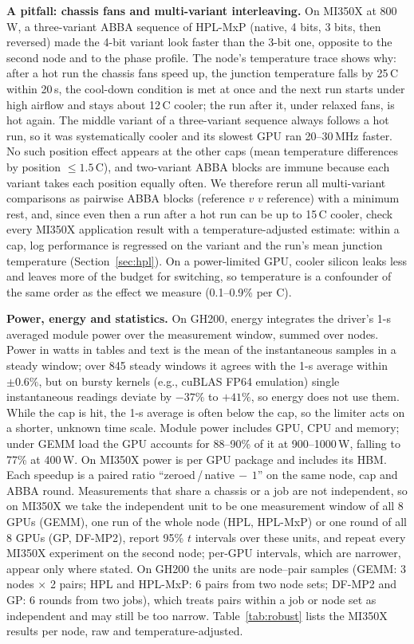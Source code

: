 \documentclass[conference]{IEEEtran}
\newcommand{\W}{\,W}
\newcommand{\pct}{\%}
\begin{document}
\textbf{A pitfall: chassis fans and multi-variant interleaving.} On MI350X at 800\W, a three-variant ABBA sequence of
HPL-MxP (native, 4 bits, 3 bits, then reversed) made the 4-bit variant look faster than the 3-bit one, opposite to
the second node and to the phase profile. The node's temperature trace shows why: after a hot run the chassis fans
speed up, the junction temperature falls by 25\,\textdegree C within 20\,s, the cool-down condition is met at once and
the next run starts under high airflow and stays about 12\,\textdegree C cooler; the run after it, under relaxed fans,
is hot again. The middle variant of a three-variant sequence always follows a hot run, so it was systematically
cooler and its slowest GPU ran 20--30\,MHz faster. No such position effect appears at the other caps (mean temperature
differences by position $\le1.5$\,\textdegree C), and two-variant ABBA blocks are immune because each variant takes each
position equally often. We therefore rerun all multi-variant comparisons as pairwise ABBA blocks (reference $v$ $v$
reference) with a minimum rest, and, since even then a run after a hot run can be up to 15\,\textdegree C cooler, check every
MI350X application result with a temperature-adjusted estimate: within a cap, log performance is regressed on the
variant and the run's mean junction temperature (Section~\ref{sec:hpl}). On a power-limited GPU, cooler silicon leaks
less and leaves more of the budget for switching, so temperature is a confounder of the same order as the effect we
measure (0.1--0.9\pct{} per \textdegree C).

\textbf{Power, energy and statistics.} On GH200, energy integrates the driver's 1-s averaged module power over the
measurement window, summed over nodes. Power in watts in tables and text is the mean of the instantaneous samples in a
steady window; over 845 steady windows it agrees with the 1-s average within $\pm0.6\pct$, but on bursty kernels (e.g.,
cuBLAS FP64 emulation) single instantaneous readings deviate by $-37\pct$ to $+41\pct$, so energy does not use them.
While the cap is hit, the 1-s average is often below the cap, so the limiter acts on a shorter, unknown time scale.
Module power includes GPU, CPU and memory; under GEMM load the GPU accounts for 88--90\pct{} of it at 900--1000\W,
falling to 77\pct{} at 400\W. On MI350X power is per GPU package and includes its HBM. Each speedup is a paired ratio
``zeroed\,/\,native$\,-\,1$'' on the same node, cap and ABBA round. Measurements that share a chassis or a job are not
independent, so on MI350X we take the independent unit to be one measurement window of all 8 GPUs (GEMM), one run of the
whole node (HPL, HPL-MxP) or one round of all 8 GPUs (GP, DF-MP2), report 95\pct{} $t$ intervals over these units, and
repeat every MI350X experiment on the second node; per-GPU intervals, which are narrower, appear only where stated. On
GH200 the units are node--pair samples (GEMM: 3 nodes $\times$ 2 pairs; HPL and HPL-MxP: 6 pairs from two node sets;
DF-MP2 and GP: 6 rounds from two jobs), which treats pairs within a job or node set as independent and may still be too
narrow. Table~\ref{tab:robust} lists the MI350X results per node, raw and temperature-adjusted.
\end{document}
